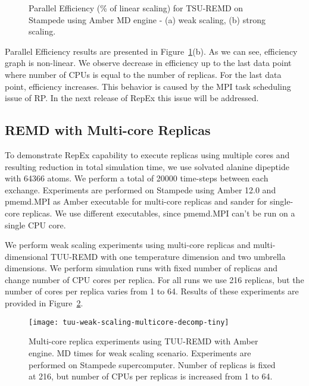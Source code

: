 \documentclass{sig-alternate-05-2015}
\begin{document}
\begin{figure}[ht!]
  \centering
  \caption{\small{Parallel Efficiency (\% of linear scaling) for TSU-REMD on Stampede using Amber MD engine - (a) weak scaling, (b) strong scaling.} 
  }
  \label{fig:p_efficiency}
\end{figure}

Parallel Efficiency results are presented in Figure~\ref{fig:p_efficiency}(b). As we can see, efficiency graph is non-linear. We observe decrease in efficiency up to the last data point where number of CPUs is equal to the number of replicas. For the last data point, efficiency increases. This behavior is caused by the MPI task scheduling issue of RP. In the next release of RepEx this issue will be addressed.   

\subsection{REMD with Multi-core Replicas} \label{exp.mcore.replicas}

To demonstrate RepEx capability to execute replicas using multiple cores and resulting reduction in total simulation time, we use solvated alanine dipeptide with 64366 atoms. We perform a total of 20000 time-steps between each exchange. Experiments are performed on Stampede using Amber 12.0 and pmemd.MPI as Amber executable for multi-core replicas and sander for single-core replicas. We use different executables, since pmemd.MPI can't be run on a single CPU core.

We perform weak scaling experiments using multi-core replicas and multi-dimensional TUU-REMD with one temperature dimension and two umbrella dimensions. We perform simulation runs with fixed number of replicas and change number of CPU cores per replica. For all runs we use 216 replicas, but the number of cores per replica varies from 1 to 64. Results of these experiments are provided in Figure~\ref{fig:multicore_3d}. 

\begin{figure}[ht!]
\centering
\texttt{[image: tuu-weak-scaling-multicore-decomp-tiny]}
\caption{\small{Multi-core replica experiments using TUU-REMD with Amber engine. MD times for weak scaling scenario. Experiments are performed on Stampede supercomputer. Number of replicas is fixed at 216, but number of CPUs per replicas is increased from 1 to 64.}}
\label{fig:multicore_3d}
\end{figure}
\end{document}
